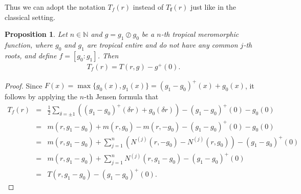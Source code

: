 \documentclass{article}
\newtheorem{proposition}[defin]{Proposition}
\begin{document}
Thus we can adopt the notation $T_{f}(r)$ instead of $T_{\textbf{f}}(r)$ just like in the classical setting.
\begin{proposition}\label{p5.3}
    Let $n\in\mathbb{N}$ and $g=g_{1}\oslash g_{0}$ be a $n$-th tropical meromorphic function, where $g_{0}$ and $g_{1}$ are tropical entire and do not have any common $j$-th roots, and define $f=[g_{0}: g_{1}]$. Then
    \begin{eqnarray*}
        T_{f}(r)=T(r, g)-g^{+}(0).
    \end{eqnarray*}
\end{proposition}
\begin{proof}
Since $F(x)=\max\{g_{0}(x), g_{1}(x)\}=(g_{1}- g_{0})^{+}(x)+g_{0}(x)$, it follows by applying the $n$-th Jensen formula that
\begin{eqnarray*}
    T_{f}(r)&=&\frac{1}{2}\sum_{\delta=\pm 1}\left((g_{1}- g_{0})^{+}(\delta r)+g_{0}(\delta r)\right)-(g_{1}- g_{0})^{+}(0)-g_{0}(0)\\
    &=&m(r, g_{1}- g_{0})+m(r, g_{0})-m(r, - g_{0})-(g_{1}- g_{0})^{+}(0)-g_{0}(0)\\
    &=&m(r, g_{1}- g_{0})+\sum_{j=1}^{n}\left(N^{(j)}(r, - g_{0})-N^{(j)}(r, g_{0})\right)-(g_{1}- g_{0})^{+}(0)\\
    &=&m(r, g_{1}- g_{0})+\sum_{j=1}^{n}N^{(j)}(r, g_{1}- g_{0})-(g_{1}- g_{0})^{+}(0)\\
    &=&T(r, g_{1}- g_{0})-(g_{1}- g_{0})^{+}(0).
\end{eqnarray*}
\end{proof}
\end{document}
